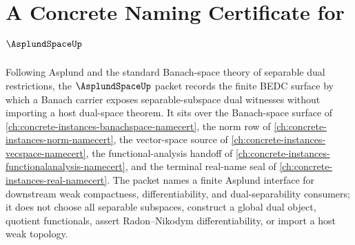\chapter{A Concrete Naming Certificate for $\AsplundSpaceUp$}
\label{ch:concrete-instances-asplund-space-namecert}

Following Asplund and the standard Banach-space theory of separable dual restrictions, the $\AsplundSpaceUp$ packet records the finite BEDC surface by which a Banach carrier exposes separable-subspace dual witnesses without importing a host dual-space theorem. It sits over the Banach-space surface of \autoref{ch:concrete-instances-banachspace-namecert}, the norm row of \autoref{ch:concrete-instances-norm-namecert}, the vector-space source of \autoref{ch:concrete-instances-vecspace-namecert}, the functional-analysis handoff of \autoref{ch:concrete-instances-functionalanalysis-namecert}, and the terminal real-name seal of \autoref{ch:concrete-instances-real-namecert}. The packet names a finite Asplund interface for downstream weak compactness, differentiability, and dual-separability consumers; it does not choose all separable subspaces, construct a global dual object, quotient functionals, assert Radon--Nikodym differentiability, or import a host weak topology.

